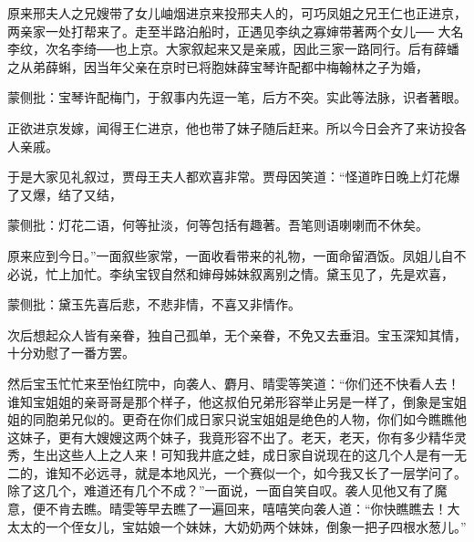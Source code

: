 \begin{parag}
    原来邢夫人之兄嫂带了女儿岫烟进京来投邢夫人的，可巧凤姐之兄王仁也正进京，两亲家一处打帮来了。走至半路泊船时，正遇见李纨之寡婶带著两个女儿── 大名李纹，次名李绮──也上京。大家叙起来又是亲戚，因此三家一路同行。后有薛蟠之从弟薛蝌，因当年父亲在京时已将胞妹薛宝琴许配都中梅翰林之子为婚，\begin{note}蒙侧批：宝琴许配梅门，于叙事内先逗一笔，后方不突。实此等法脉，识者著眼。\end{note}正欲进京发嫁，闻得王仁进京，他也带了妹子随后赶来。所以今日会齐了来访投各人亲戚。
\end{parag}


\begin{parag}
    于是大家见礼叙过，贾母王夫人都欢喜非常。贾母因笑道：“怪道昨日晚上灯花爆了又爆，结了又结，\begin{note}蒙侧批：灯花二语，何等扯淡，何等包括有趣著。吾笔则语喇喇而不休矣。\end{note}原来应到今日。”一面叙些家常，一面收看带来的礼物，一面命留酒饭。凤姐儿自不必说，忙上加忙。李纨宝钗自然和婶母姊妹叙离别之情。黛玉见了，先是欢喜，\begin{note}蒙侧批：黛玉先喜后悲，不悲非情，不喜又非情作。\end{note}次后想起众人皆有亲眷，独自己孤单，无个亲眷，不免又去垂泪。宝玉深知其情，十分劝慰了一番方罢。
\end{parag}


\begin{parag}
    然后宝玉忙忙来至怡红院中，向袭人、麝月、晴雯等笑道：“你们还不快看人去！谁知宝姐姐的亲哥哥是那个样子，他这叔伯兄弟形容举止另是一样了，倒象是宝姐姐的同胞弟兄似的。更奇在你们成日家只说宝姐姐是绝色的人物，你们如今瞧瞧他这妹子，更有大嫂嫂这两个妹子，我竟形容不出了。老天，老天，你有多少精华灵秀，生出这些人上之人来！可知我井底之蛙，成日家自说现在的这几个人是有一无二的，谁知不必远寻，就是本地风光，一个赛似一个，如今我又长了一层学问了。除了这几个，难道还有几个不成？”一面说，一面自笑自叹。袭人见他又有了魔意，便不肯去瞧。晴雯等早去瞧了一遍回来，嘻嘻笑向袭人道：“你快瞧瞧去！大太太的一个侄女儿，宝姑娘一个妹妹，大奶奶两个妹妹，倒象一把子四根水葱儿。”
\end{parag}


